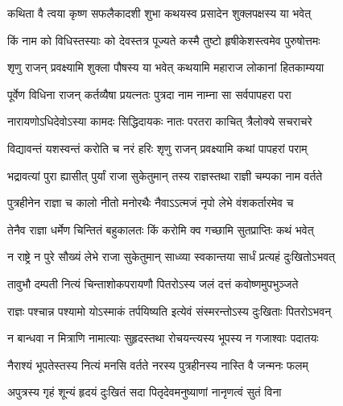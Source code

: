 \label{sec:padma-pausha-shukla-putrada}

\ganapatyadiDhyanam
\padmaPuranam



\twolineshloka
{कथिता वै त्वया कृष्ण सफलैकादशी शुभा}
{कथयस्व प्रसादेन शुक्लपक्षस्य या भवेत्}%

\twolineshloka
{किं नाम को विधिस्तस्याः को देवस्तत्र पूज्यते}
{कस्मै तुष्टो हृषीकेशस्त्वमेव पुरुषोत्तमः}%


\twolineshloka
{शृणु राजन् प्रवक्ष्यामि शुक्ला पौषस्य या भवेत्}
{कथयामि महाराज लोकानां हितकाम्यया}%

\twolineshloka
{पूर्वेण विधिना राजन् कर्तव्यैषा प्रयत्नतः}
{पुत्रदा नाम नाम्ना सा सर्वपापहरा परा}%

\twolineshloka
{नारायणोऽधिदेवोऽस्या कामदः सिद्धिदायकः}
{नातः परतरा काचित् त्रैलोक्ये सचराचरे}%

\twolineshloka
{विद्यावन्तं यशस्वन्तं करोति च नरं हरिः}
{शृणु राजन् प्रवक्ष्यामि कथां पापहरां पराम्}%

\twolineshloka
{भद्रावत्यां पुरा ह्यासीत् पुर्यां राजा सुकेतुमान्}
{तस्य राज्ञस्तथा राज्ञी चम्पका नाम वर्तते}%

\twolineshloka
{पुत्रहीनेन राज्ञा च कालो नीतो मनोरथैः}
{नैवाऽऽत्मजं नृपो लेभे वंशकर्तारमेव च}%

\twolineshloka
{तेनैव राज्ञा धर्मेण चिन्तितं बहुकालतः}
{किं करोमि क्व गच्छामि सुतप्राप्तिः कथं भवेत्}%

\twolineshloka
{न राष्ट्रे न पुरे सौख्यं लेभे राजा सुकेतुमान्}
{साध्व्या स्वकान्तया सार्धं प्रत्यहं दुःखितोऽभवत्}%

\twolineshloka
{तावुभौ दम्पती नित्यं चिन्ताशोकपरायणौ}
{पितरोऽस्य जलं दत्तं कवोष्णमुपभुञ्जते}%

\twolineshloka
{राज्ञः पश्चान्न पश्यामो योऽस्माकं तर्पयिष्यति}
{इत्येवं संस्मरन्तोऽस्य दुःखिताः पितरोऽभवन्}%

\twolineshloka
{न बान्धवा न मित्राणि नामात्याः सुहृदस्तथा}
{रोचयन्त्यस्य भूपस्य न गजाश्वाः पदातयः}%

\twolineshloka
{नैराश्यं भूपतेस्तस्य नित्यं मनसि वर्तते}
{नरस्य पुत्रहीनस्य नास्ति वै जन्मनः फलम्}%

\twolineshloka
{अपुत्रस्य गृहं शून्यं हृदयं दुःखितं सदा}
{पितृदेवमनुष्याणां नानृणत्वं सुतं विना}%

